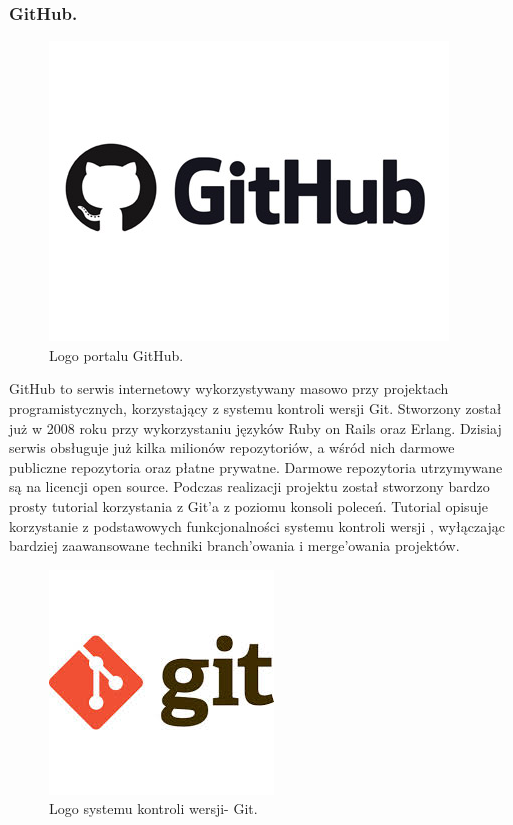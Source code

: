 \documentclass[a4paper,12pt]{article}		%
\begin{document}
\subsubsection{GitHub.}
\begin{figure}[h!]
\centering
\includegraphics[scale=0.6]{Resources/GitHub_Logo.jpg}
\caption{Logo portalu GitHub.} 
\end{figure}
GitHub to serwis internetowy wykorzystywany masowo przy projektach programistycznych, korzystający z systemu kontroli wersji Git. Stworzony został już w 2008 roku przy wykorzystaniu języków Ruby on Rails oraz Erlang. Dzisiaj serwis obsługuje już kilka milionów repozytoriów, a wśród nich darmowe publiczne repozytoria oraz płatne prywatne. Darmowe repozytoria utrzymywane są na licencji open source. Podczas realizacji projektu został stworzony bardzo prosty tutorial korzystania z Git'a z poziomu konsoli poleceń. Tutorial opisuje korzystanie z podstawowych funkcjonalności systemu kontroli wersji , wyłączając bardziej zaawansowane techniki branch'owania i merge'owania projektów.
\begin{figure}[h!]
\centering
\includegraphics[scale=0.4]{Resources/Git_Logo.jpg}
\caption{Logo systemu kontroli wersji- Git.} 
\end{figure} 
\end{document}
